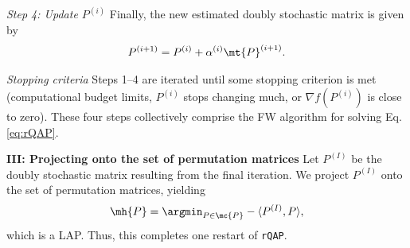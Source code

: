 \documentclass[10pt,journal,cspaper,compsoc]{IEEEtran}
\newcommand{\PmcP}{P \in \mc{P}}
\begin{document}

\emph{Step 4: Update $P^{(i)}$} Finally, the new estimated doubly stochastic matrix is given by
\begin{align}\label{eq:update}
	P^{(i+1)} = P^{(i)} + \alpha^{(i)} \mt{P}^{(i+1)}.
\end{align}


\emph{Stopping criteria} Steps 1--4 are iterated until some stopping criterion is met (computational budget limits, $P^{(i)}$ stops changing much, or $\nabla f(P^{(i)})$ is close to zero).  These four steps collectively comprise the FW algorithm for solving Eq. \eqref{eq:rQAP}.  %


\textbf{III: Projecting onto the set of permutation matrices}   Let $P^{(I)}$ be the doubly stochastic matrix resulting from the final iteration.  We project $P^{(I)}$ onto the set of permutation matrices, yielding
\begin{align} \label{eq:proj}
	\mh{P} = \argmin_{\PmcP} -\langle P^{(I)}, P \rangle,
\end{align}
which is a LAP.  Thus, this completes one restart of \texttt{rQAP}.




% 
\end{document}
